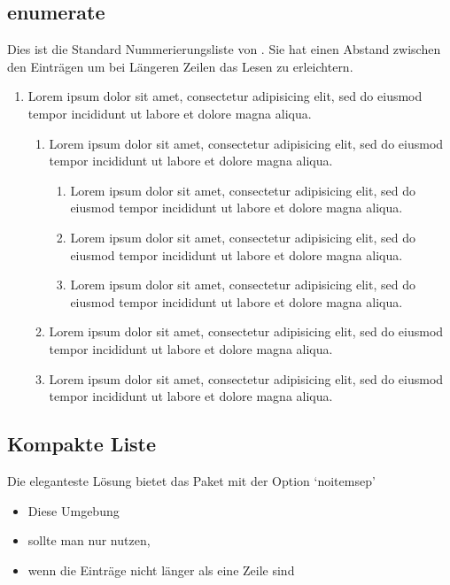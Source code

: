 \subsection{enumerate}
Dies ist die Standard Nummerierungsliste von \LaTeXe{}. Sie hat einen Abstand zwischen den Einträgen um bei Längeren Zeilen das Lesen zu erleichtern.

\begin{enumerate}
   \item Lorem ipsum dolor sit amet, consectetur adipisicing elit, sed do eiusmod tempor incididunt ut labore et dolore magna aliqua.
%
   \begin{enumerate}
      \item Lorem ipsum dolor sit amet, consectetur adipisicing elit, sed do eiusmod tempor incididunt ut labore et dolore magna aliqua.
      \begin{enumerate}
         \item Lorem ipsum dolor sit amet, consectetur adipisicing elit, sed do eiusmod tempor incididunt ut labore et dolore magna aliqua.
         \item Lorem ipsum dolor sit amet, consectetur adipisicing elit, sed do eiusmod tempor incididunt ut labore et dolore magna aliqua.
         \item Lorem ipsum dolor sit amet, consectetur adipisicing elit, sed do eiusmod tempor incididunt ut labore et dolore magna aliqua.
      \end{enumerate}
      \item Lorem ipsum dolor sit amet, consectetur adipisicing elit, sed do eiusmod tempor incididunt ut labore et dolore magna aliqua.
      \item Lorem ipsum dolor sit amet, consectetur adipisicing elit, sed do eiusmod tempor incididunt ut labore et dolore magna aliqua.
   \end{enumerate}
\end{enumerate}

%
\subsection{Kompakte Liste}

Die eleganteste Lösung bietet das Paket  mit der Option `noitemsep'
\begin{itemize}[noitemsep]
\item Diese Umgebung
\item sollte man nur nutzen,
\item wenn die Einträge nicht länger als eine Zeile sind
\end{itemize}

